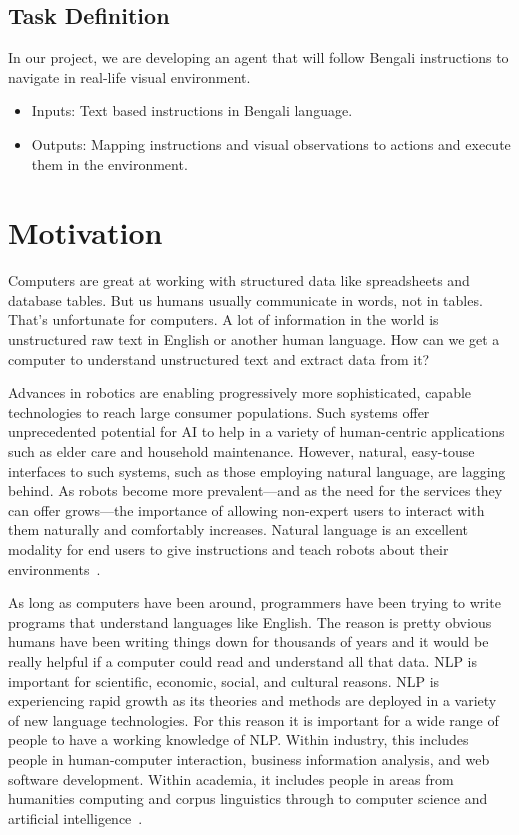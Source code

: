 \subsection{Task Definition}
In our project, we are developing an agent that will follow Bengali instructions to navigate in real-life visual environment.
\begin{itemize}
	\item Inputs: Text based instructions in Bengali language.
	\item Outputs: Mapping instructions and visual observations to actions and execute them in the environment.
\end{itemize}

\section{Motivation}
Computers are great at working with structured data like spreadsheets and database tables. But us humans usually communicate in words, not in tables. That’s unfortunate for computers. A lot of information in the world is unstructured raw text in English or another human language. How can we get a computer to understand unstructured text and extract data from it?

Advances in robotics are enabling progressively more sophisticated, capable technologies to reach large consumer populations. Such systems offer unprecedented potential for AI to help in a variety of human-centric applications such as elder care and household maintenance. However, natural, easy-touse interfaces to such systems, such as those employing natural language, are lagging behind. As robots become more prevalent—and as the need for the services they can offer grows—the importance of allowing non-expert users to interact with them naturally and comfortably increases. Natural language is an excellent modality for end users to give instructions and teach robots about their environments~\cite{ijcai2018-810}. 

As long as computers have been around, programmers have been trying to write programs that understand languages like English. The reason is pretty obvious humans have been writing things down for thousands of years and it would be really helpful if a computer could read and understand all that data. 
NLP is important for scientific, economic, social, and cultural reasons. NLP is experiencing rapid growth as its theories and methods are deployed in a variety of new language technologies. For this reason it is important for a wide range of people to have a working knowledge of NLP. Within industry, this includes people in human-computer interaction, business information analysis, and web software development. Within academia, it includes people in areas from humanities computing and corpus linguistics through to computer science and artificial intelligence~\cite{NLPbook}.

